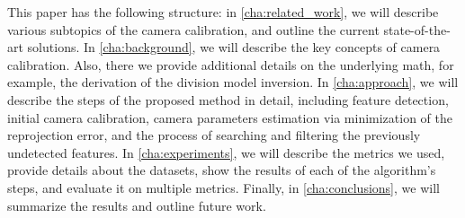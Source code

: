 This paper has the following structure: in \cref{cha:related_work}, we will describe
various subtopics of the camera calibration, and outline the current state-of-the-art solutions.
In \cref{cha:background}, we will describe the key concepts of camera
calibration. Also, there we provide additional details on the underlying math,
for example, the derivation of the division model inversion. In
\cref{cha:approach}, we will describe the steps of the proposed method in
detail, including feature detection, initial camera calibration, camera
parameters estimation via minimization of the reprojection error, and the
process of searching and filtering the previously undetected features. In
\cref{cha:experiments}, we will describe the metrics we used, provide details about
the datasets, show the results of each of the algorithm's steps, and evaluate it
on multiple metrics. Finally, in \cref{cha:conclusions}, we will summarize the
results and outline future work.


